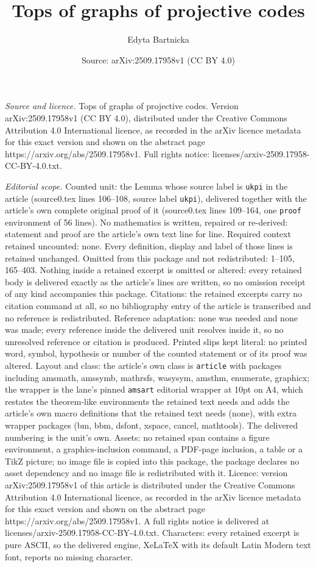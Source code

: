 \documentclass[10pt,a4paper]{amsart}
\title[Tops of graphs of projective codes]{Tops of graphs of projective codes}
\author{Edyta Bartnicka}
\date{Source: arXiv:2509.17958v1 (CC BY 4.0)}
\begin{document}
\maketitle

\noindent\emph{Source and licence.} Tops of graphs of projective codes. Version arXiv:2509.17958v1 (CC BY 4.0), distributed under the Creative Commons Attribution 4.0 International licence, as recorded in the arXiv licence metadata for this exact version and shown on the abstract page https://arxiv.org/abs/2509.17958v1. Full rights notice: licenses/arxiv-2509.17958-CC-BY-4.0.txt.\par\smallskip

\noindent\textit{Editorial scope.} Counted unit: the Lemma whose source label is \texttt{ukpi} in the article (source0.tex lines 106--108, source label \texttt{ukpi}), delivered together with the article's own complete original proof of it (source0.tex lines 109--164, one \texttt{proof} environment of 56 lines). No mathematics is written, repaired or re-derived: statement and proof are the article's own text line for line. Required context retained uncounted: none. Every definition, display and label of those lines is retained unchanged. Omitted from this package and not redistributed: 1--105, 165--403. Nothing inside a retained excerpt is omitted or altered: every retained body is delivered exactly as the article's lines are written, so no omission receipt of any kind accompanies this package. Citations: the retained excerpts carry no citation command at all, so no bibliography entry of the article is transcribed and no reference is redistributed. Reference adaptation: none was needed and none was made; every reference inside the delivered unit resolves inside it, so no unresolved reference or citation is produced. Printed slips kept literal: no printed word, symbol, hypothesis or number of the counted statement or of its proof was altered. Layout and class: the article's own class is \texttt{article} with packages including amsmath, amssymb, mathrsfs, wasysym, amsthm, enumerate, graphicx; the wrapper is the lane's pinned \texttt{amsart} editorial wrapper at 10pt on A4, which restates the theorem-like environments the retained text needs and adds the article's own macro definitions that the retained text needs (none), with extra wrapper packages (bm, bbm, dsfont, xspace, cancel, mathtools). The delivered numbering is the unit's own. Assets: no retained span contains a figure environment, a graphics-inclusion command, a PDF-page inclusion, a table or a TikZ picture; no image file is copied into this package, the package declares no asset dependency and no image file is redistributed with it. Licence: version arXiv:2509.17958v1 of this article is distributed under the Creative Commons Attribution 4.0 International licence, as recorded in the arXiv licence metadata for this exact version and shown on the abstract page https://arxiv.org/abs/2509.17958v1. A full rights notice is delivered at licenses/arxiv-2509.17958-CC-BY-4.0.txt. Characters: every retained excerpt is pure ASCII, so the delivered engine, XeLaTeX with its default Latin Modern text font, reports no missing character.
\end{document}
